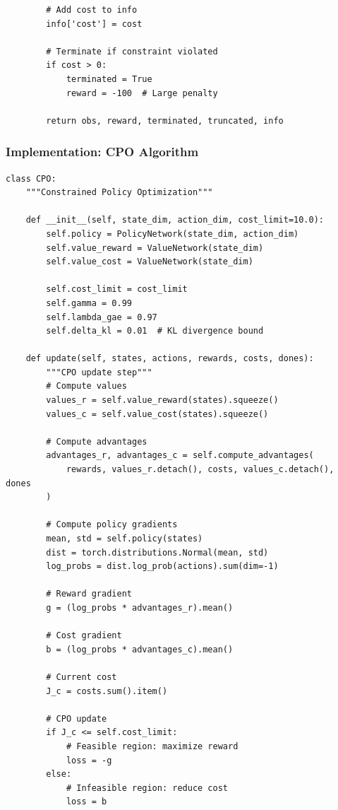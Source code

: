 \documentclass[12pt]{article}
\begin{document}
{{{{\begin{verbatim}
        # Add cost to info
        info['cost'] = cost
        
        # Terminate if constraint violated
        if cost > 0:
            terminated = True
            reward = -100  # Large penalty
        
        return obs, reward, terminated, truncated, info
\end{verbatim}

\subsubsection{Implementation: CPO Algorithm}

\begin{verbatim}
class CPO:
    """Constrained Policy Optimization"""
    
    def __init__(self, state_dim, action_dim, cost_limit=10.0):
        self.policy = PolicyNetwork(state_dim, action_dim)
        self.value_reward = ValueNetwork(state_dim)
        self.value_cost = ValueNetwork(state_dim)
        
        self.cost_limit = cost_limit
        self.gamma = 0.99
        self.lambda_gae = 0.97
        self.delta_kl = 0.01  # KL divergence bound
    
    def update(self, states, actions, rewards, costs, dones):
        """CPO update step"""
        # Compute values
        values_r = self.value_reward(states).squeeze()
        values_c = self.value_cost(states).squeeze()
        
        # Compute advantages
        advantages_r, advantages_c = self.compute_advantages(
            rewards, values_r.detach(), costs, values_c.detach(), dones
        )
        
        # Compute policy gradients
        mean, std = self.policy(states)
        dist = torch.distributions.Normal(mean, std)
        log_probs = dist.log_prob(actions).sum(dim=-1)
        
        # Reward gradient
        g = (log_probs * advantages_r).mean()
        
        # Cost gradient
        b = (log_probs * advantages_c).mean()
        
        # Current cost
        J_c = costs.sum().item()
        
        # CPO update
        if J_c <= self.cost_limit:
            # Feasible region: maximize reward
            loss = -g
        else:
            # Infeasible region: reduce cost
            loss = b
        

\end{verbatim}}}}}
\end{document}
